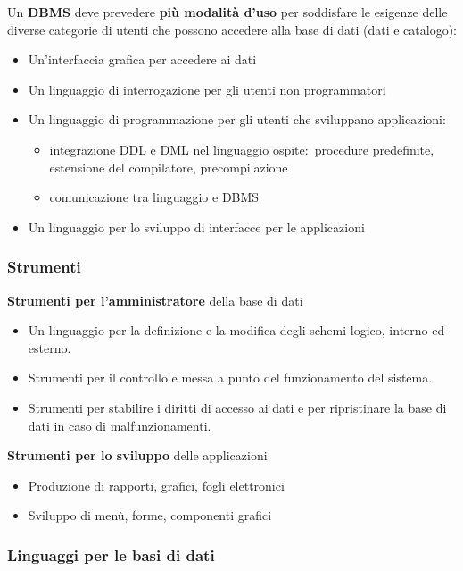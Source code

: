 Un \textbf{DBMS} deve prevedere \textbf{più modalità d'uso} per soddisfare le esigenze delle diverse categorie di utenti che possono accedere alla base di dati (dati e catalogo):
\begin{itemize}
	\item Un'interfaccia grafica per accedere ai dati
	\item Un linguaggio di interrogazione per gli utenti non programmatori
	\item Un linguaggio di programmazione per gli utenti che sviluppano applicazioni:
	      \begin{itemize}
		      \item integrazione DDL e DML nel linguaggio ospite:\ procedure predefinite, estensione del compilatore, precompilazione
		      \item comunicazione tra linguaggio e DBMS
	      \end{itemize}
	\item Un linguaggio per lo sviluppo di interfacce per le applicazioni
\end{itemize}

\subsubsection{Strumenti}

\textbf{Strumenti per l'amministratore} della base di dati
\begin{itemize}
	\item Un linguaggio per la definizione e la modifica degli schemi logico, interno ed esterno.
	\item Strumenti per il controllo e messa a punto del funzionamento del sistema.
	\item Strumenti per stabilire i diritti di accesso ai dati e per ripristinare la base di dati in caso di malfunzionamenti.
\end{itemize}
\textbf{Strumenti per lo sviluppo} delle applicazioni
\begin{itemize}
	\item Produzione di rapporti, grafici, fogli elettronici
	\item Sviluppo di menù, forme, componenti grafici
\end{itemize}

\subsubsection{Linguaggi per le basi di dati}

